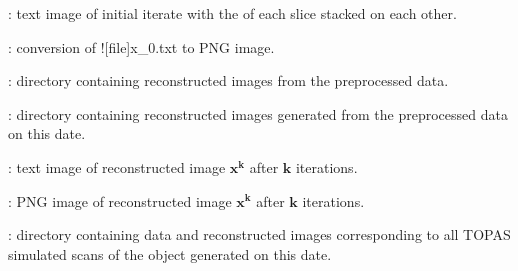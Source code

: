 \begin{tcbenvironment}
\begin{tcbparagraph}
\begin{ThinEnum}
\begin{ThinEnum}
\begin{ThinEnum}
\begin{ThinEnum}
\begin{ThinEnum}
\begin{ThinEnum}
\begin{ThinEnum}
\begin{ThinEnum}
\begin{ThinEnum}
\newpage
                                        	\item {} : text image of initial iterate with the \xyplane* of each slice stacked on each other.
                                        	\item {} : conversion of \docentry![file]{x\_0.txt} to PNG image.
                                        \item {} : directory containing reconstructed images from the preprocessed data.
                                        \begin{ThinEnum}
                                            \item {} : directory containing reconstructed images generated from the preprocessed data on this date.
                                                \begin{ThinEnum}
                                                    \item {} : text image of reconstructed image $\boldsymbol{x^k}$ after $\boldsymbol{k}$ iterations.
                                                    \item {} : PNG image of reconstructed image $\boldsymbol{x^k}$ after $\boldsymbol{k}$ iterations.
                                                \end{ThinEnum}%
                                        \end{ThinEnum}%
                                    \end{ThinEnum}%
                                \end{ThinEnum}%
                            \end{ThinEnum}%
                        \end{ThinEnum}%
                    \end{ThinEnum}%
                \end{ThinEnum}%
                \item {} : directory containing data and reconstructed images corresponding to all TOPAS simulated scans of the object generated on this date.

\end{ThinEnum}
\end{ThinEnum}
\end{ThinEnum}
\end{tcbparagraph}
\end{tcbenvironment}
